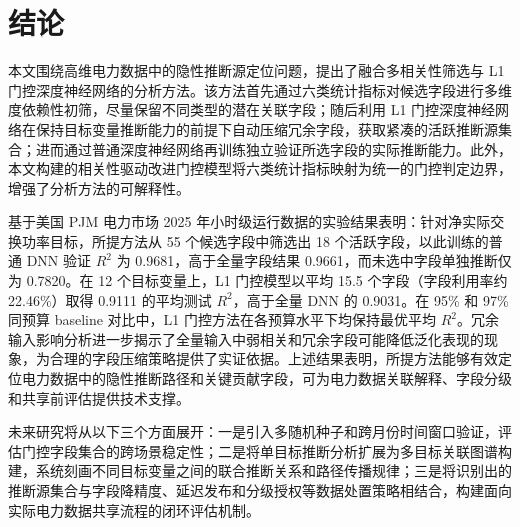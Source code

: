 \documentclass[UTF8,zihao=5,twoside]{ctexart}
\numberwithin{equation}{section}
\begin{document}
\section{结论}
本文围绕高维电力数据中的隐性推断源定位问题，提出了融合多相关性筛选与 L1 门控深度神经网络的分析方法。该方法首先通过六类统计指标对候选字段进行多维度依赖性初筛，尽量保留不同类型的潜在关联字段；随后利用 L1 门控深度神经网络在保持目标变量推断能力的前提下自动压缩冗余字段，获取紧凑的活跃推断源集合；进而通过普通深度神经网络再训练独立验证所选字段的实际推断能力。此外，本文构建的相关性驱动改进门控模型将六类统计指标映射为统一的门控判定边界，增强了分析方法的可解释性。

基于美国 PJM 电力市场 2025 年小时级运行数据的实验结果表明：针对净实际交换功率目标，所提方法从 55 个候选字段中筛选出 18 个活跃字段，以此训练的普通 DNN 验证 $R^2$ 为 0.9681，高于全量字段结果 0.9661，而未选中字段单独推断仅为 0.7820。在 12 个目标变量上，L1 门控模型以平均 15.5 个字段（字段利用率约 22.46\%）取得 0.9111 的平均测试 $R^2$，高于全量 DNN 的 0.9031。在 95\% 和 97\% 同预算 baseline 对比中，L1 门控方法在各预算水平下均保持最优平均 $R^2$。冗余输入影响分析进一步揭示了全量输入中弱相关和冗余字段可能降低泛化表现的现象，为合理的字段压缩策略提供了实证依据。上述结果表明，所提方法能够有效定位电力数据中的隐性推断路径和关键贡献字段，可为电力数据关联解释、字段分级和共享前评估提供技术支撑。

未来研究将从以下三个方面展开：一是引入多随机种子和跨月份时间窗口验证，评估门控字段集合的跨场景稳定性；二是将单目标推断分析扩展为多目标关联图谱构建，系统刻画不同目标变量之间的联合推断关系和路径传播规律；三是将识别出的推断源集合与字段降精度、延迟发布和分级授权等数据处置策略相结合，构建面向实际电力数据共享流程的闭环评估机制。
\end{document}
